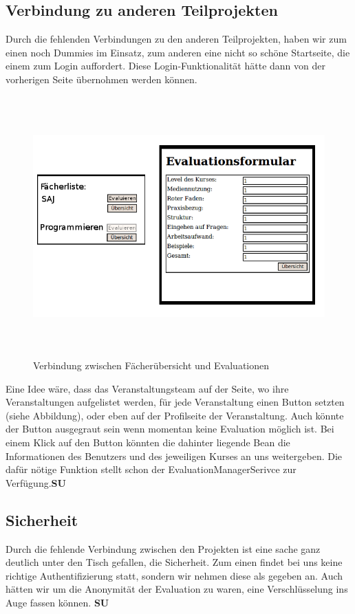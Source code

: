 \documentclass[titlepage, 12pt,a4paper]{scrartcl}
\begin{document}
\subsection{Verbindung zu anderen Teilprojekten}
Durch die fehlenden Verbindungen zu den anderen Teilprojekten, haben wir zum einen noch Dummies im Einsatz,
zum anderen eine nicht so schöne Startseite, die einem zum Login auffordert. Diese Login-Funktionalität
hätte dann von der vorherigen Seite übernohmen werden können. 
\begin{figure}[htb]
\begin{center}
\includegraphics[width=15cm, height=10cm]{bilder/Connection.png}
\caption{Verbindung zwischen Fächerübersicht und Evaluationen}
\label{connection}
\end{center}
\end{figure}
Eine Idee wäre, dass das Veranstaltungsteam auf der Seite, wo ihre Veranstaltungen aufgelistet werden, für jede
Veranstaltung einen Button setzten (siehe Abbildung), oder eben auf der Profilseite der Veranstaltung. Auch könnte
der Button ausgegraut sein wenn momentan keine Evaluation möglich ist. Bei einem Klick auf den Button könnten die 
dahinter liegende Bean die Informationen des Benutzers und des jeweiligen Kurses an uns weitergeben. Die dafür
nötige Funktion stellt schon der EvaluationManagerSerivce zur Verfügung.{\bf{SU}}
\subsection{Sicherheit}
Durch die fehlende Verbindung zwischen den Projekten ist eine sache ganz deutlich unter den Tisch gefallen,
die Sicherheit. Zum einen findet bei uns keine richtige Authentifizierung statt, sondern wir nehmen diese
als gegeben an. Auch hätten wir um die Anonymität der Evaluation zu waren, eine Verschlüsselung ins Auge
fassen können.
{\bf{SU}}
\end{document}
